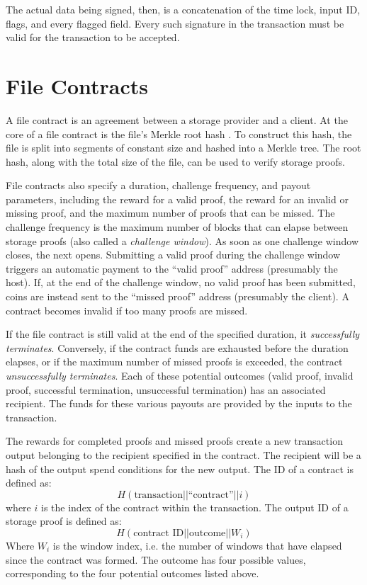 \documentclass[twocolumn]{article}
\begin{document}
The actual data being signed, then, is a concatenation of the time lock, input ID, flags, and every flagged field.
Every such signature in the transaction must be valid for the transaction to be accepted.

\section{File Contracts}
\label{sec:contracts}
A file contract is an agreement between a storage provider and a client.
At the core of a file contract is the file's Merkle root hash \cite{merkle}.
To construct this hash, the file is split into segments of constant size and hashed into a Merkle tree.
The root hash, along with the total size of the file, can be used to verify storage proofs.

File contracts also specify a duration, challenge frequency, and payout parameters, including the reward for a valid proof, the reward for an invalid or missing proof, and the maximum number of proofs that can be missed.
The challenge frequency is the maximum number of blocks that can elapse between storage proofs (also called a \textit{challenge window}).
As soon as one challenge window closes, the next opens. %
Submitting a valid proof during the challenge window triggers an automatic payment to the ``valid proof'' address (presumably the host).
If, at the end of the challenge window, no valid proof has been submitted, coins are instead sent to the ``missed proof'' address (presumably the client).
A contract becomes invalid if too many proofs are missed.

If the file contract is still valid at the end of the specified duration, it \textit{successfully terminates}.
Conversely, if the contract funds are exhausted before the duration elapses, or if the maximum number of missed proofs is exceeded, the contract \textit{unsuccessfully terminates}.
Each of these potential outcomes (valid proof, invalid proof, successful termination, unsuccessful termination) has an associated recipient.
The funds for these various payouts are provided by the inputs to the transaction.

The rewards for completed proofs and missed proofs create a new transaction output belonging to the recipient specified in the contract.
The recipient will be a hash of the output spend conditions for the new output.
The ID of a contract is defined as:
\[
	H(\text{transaction} || \text{``contract''} || i)
\]
where $i$ is the index of the contract within the transaction.
The output ID of a storage proof is defined as:
\[
	H(\text{contract ID} || \text{outcome} || W_i)
\]
Where $W_i$ is the window index, i.e. the number of windows that have elapsed since the contract was formed.
The outcome has four possible values, corresponding to the four potential outcomes listed above. %
\end{document}
